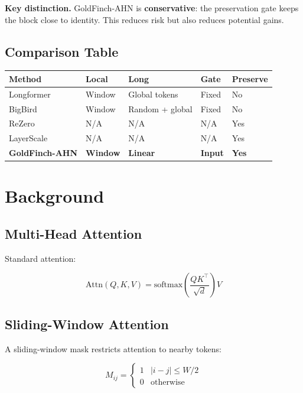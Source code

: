 \textbf{Key distinction.} GoldFinch-AHN is \textbf{conservative}: the preservation 
gate keeps the block close to identity. This reduces risk but also reduces 
potential gains.



\subsection{Comparison Table}

\begin{table}[H]
\centering
\small
\begin{tabular}{lllll}
\toprule
\textbf{Method} & \textbf{Local} & \textbf{Long} & \textbf{Gate} & \textbf{Preserve} \\
\midrule
Longformer & Window & Global tokens & Fixed & No \\
BigBird & Window & Random + global & Fixed & No \\
ReZero & N/A & N/A & N/A & Yes \\
LayerScale & N/A & N/A & N/A & Yes \\
\textbf{GoldFinch-AHN} & \textbf{Window} & \textbf{Linear} & \textbf{Input} & \textbf{Yes} \\
\bottomrule
\end{tabular}
\end{table}




\section{Background}

\subsection{Multi-Head Attention}

Standard attention:

\[
\text{Attn}(Q, K, V) = \text{softmax}\!\left(\frac{QK^\top}{\sqrt{d}}\right)V
\tag{3.1}
\]

\subsection{Sliding-Window Attention}

A sliding-window mask restricts attention to nearby tokens:

\[
M_{ij} = \begin{cases} 1 & |i - j| \leq W/2 \\ 0 & \text{otherwise} \end{cases}
\tag{3.2}
\]

